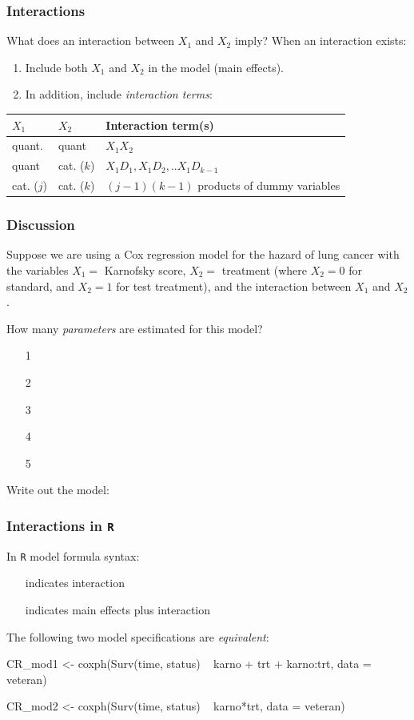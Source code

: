 \begin{frame}
\frametitle{Interactions}
What does an interaction between $X_1$ and $X_2$ imply?
\vskip70pt
When an interaction exists:
\begin{enumerate}
\item Include both $X_1$ and $X_2$ in the model (main effects).
\item In addition, include \emph{interaction terms}:
\item[]
\end{enumerate}
\begin{tabular}{lll}
\hline
$X_1$ & $X_2$ & Interaction term(s) \\
\hline\hline
quant. & quant & $X_1X_2$ \\
quant & cat. ($k$)   & $X_1D_1, X_1D_2,.. X_1D_{k-1}$ \\
cat. ($j$)  & cat. ($k$)  & $(j-1)(k-1)$ products of dummy variables \\
\hline
\end{tabular}
\end{frame}


\begin{frame}
\frametitle{Discussion}
Suppose we are using a Cox regression model for the hazard of lung cancer with the variables $X_1=$ Karnofsky score, $X_2=$ treatment (where $X_2=0$ for standard, and $X_2=1$ for test treatment), and the interaction between $X_1$ and $X_2$.
\begin{clicker}{How many \emph{parameters} are estimated for this model?}
\begin{enumerate}
\item[1]
\item[2]
\item[3]
\item[4]
\item[5]
\end{enumerate}
\end{clicker}
Write out the model:
\vskip100pt
\end{frame}


\begin{frame}[fragile]
\frametitle{Interactions in \texttt{R}}
In \texttt{R} model formula syntax:
\begin{itemize}
\item[\fbox{\texttt{:}}] indicates interaction
\item[\fbox{\texttt{*}}] indicates main effects plus interaction
\item[]
\end{itemize}
The following two model specifications are \emph{equivalent}:
\begin{Rcode}{-0.03}
CR_mod1 <- coxph(Surv(time, status) ~ karno + trt + karno:trt,
                data = veteran)

CR_mod2 <- coxph(Surv(time, status) ~ karno*trt,
                data = veteran)
\end{Rcode}
\end{frame}

